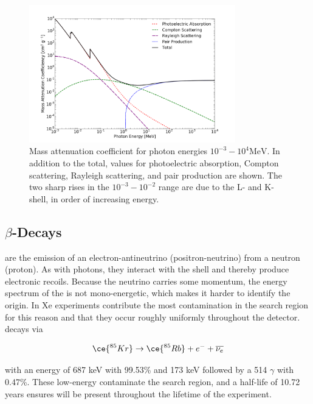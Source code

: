\begin{figure}
 \centering
 \includegraphics[width=0.8\textwidth]{PhotonAttenuation}
 \caption{Mass attenuation coefficient for photon energies $10^{-3} - 10^{4} \mathrm{MeV}$.  In addition to the total, values for
 photoelectric absorption, Compton scattering, Rayleigh scattering, and pair production are shown.  The two sharp rises in the
 $10^{-3} - 10^{-2}$ range are due to the L- and K-shell, in order of increasing energy.}
 \label{fig:phot_atten}
\end{figure}


\subsection{$\beta$-Decays}
\label{subsec:beta}
\betadecays are the emission of an electron-antineutrino (positron-neutrino) from a neutron (proton).  As with photons, they interact
with the \electron shell and thereby produce electronic recoils.  Because the neutrino carries
some momentum, the energy spectrum of the \electron is not mono-energetic, which makes it harder to identify the origin.  In Xe
experiments \betadecays contribute the most contamination in the search region for this reason and that they occur roughly uniformly
throughout the detector.  \krypton decays via

\begin{equation}
\ce{^{85}Kr} \rightarrow \ce{^{85}Rb} + e^{-} + \overline{\nu_{e}}
\end{equation}

\noindent with an energy of 687 keV with 99.53\% and 173 keV followed by a 514 $\gamma$ with 0.47\%.  These low-energy \betadecays
contaminate the search region, and a half-life of 10.72 years ensures  will be present throughout the lifetime of the
experiment.

